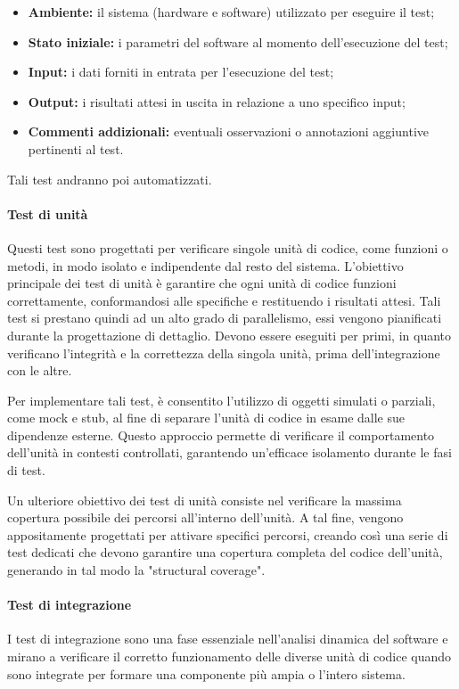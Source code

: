\begin{itemize}
    \item \textbf{Ambiente:} 
        il sistema (hardware e software) utilizzato per eseguire il test;
    \item \textbf{Stato iniziale:} 
        i parametri del software al momento dell'esecuzione del test;
    \item \textbf{Input:} 
        i dati forniti in entrata per l'esecuzione del test;
    \item \textbf{Output:} 
        i risultati attesi in uscita in relazione a uno specifico input;
    \item \textbf{Commenti addizionali:} 
        eventuali osservazioni o annotazioni aggiuntive pertinenti al test.
\end{itemize}
Tali test andranno poi automatizzati.

\paragraph{Test di unità}
Questi test sono progettati per verificare singole unità di codice, come funzioni o metodi, in modo isolato e indipendente dal resto del sistema. L'obiettivo principale dei test di unità è garantire che ogni unità di codice funzioni correttamente, conformandosi alle specifiche e restituendo i risultati attesi.
Tali test si prestano quindi ad un alto grado di parallelismo, essi vengono pianificati durante la progettazione di dettaglio.
Devono essere eseguiti per primi, in quanto verificano l’integrità e la correttezza della singola unità, prima dell’integrazione con le altre.

Per implementare tali test, è consentito l'utilizzo di oggetti simulati o parziali, come mock e stub, al fine di separare l'unità di codice in esame dalle sue dipendenze esterne. Questo approccio permette di verificare il comportamento dell'unità in contesti controllati, garantendo un'efficace isolamento durante le fasi di test.

Un ulteriore obiettivo dei test di unità consiste nel verificare la massima copertura possibile dei percorsi all'interno dell'unità. A tal fine, vengono appositamente progettati per attivare specifici percorsi, creando così una serie di test dedicati che devono garantire una copertura completa del codice dell'unità, generando in tal modo la "structural coverage".

\paragraph{Test di integrazione}
I test di integrazione sono una fase essenziale nell'analisi dinamica del software e mirano a verificare il corretto funzionamento delle diverse unità di codice quando sono integrate per formare una componente più ampia o l'intero sistema.

